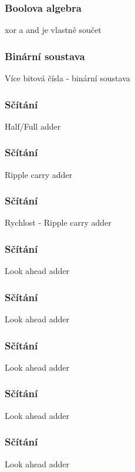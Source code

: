 \documentclass{beamer}
\begin{document}
\begin{frame}
\frametitle{Boolova algebra}

xor a and je vlastně součet
\end{frame}

\begin{frame}
\frametitle{Binární soustava}

Více bitová čísla - binární soustava
\end{frame}

\begin{frame}
\frametitle{Sčítání}

Half/Full adder
\end{frame}

\begin{frame}
\frametitle{Sčítání}

Ripple carry adder
\end{frame}

\begin{frame}
\frametitle{Sčítání}

Rychlost - Ripple carry adder
\end{frame}

\begin{frame}
\frametitle{Sčítání}

Look ahead adder
\end{frame}

\begin{frame}
\frametitle{Sčítání}

Look ahead adder
\end{frame}

\begin{frame}
\frametitle{Sčítání}

Look ahead adder
\end{frame}

\begin{frame}
\frametitle{Sčítání}

Look ahead adder
\end{frame}

\begin{frame}
\frametitle{Sčítání}

Look ahead adder
\end{frame}
\end{document}
